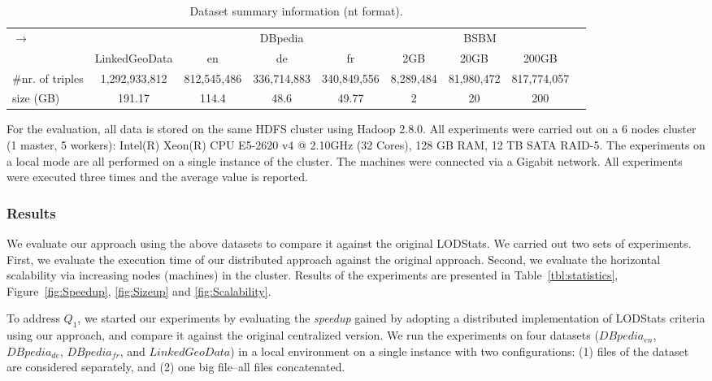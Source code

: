 \begin{table}
\centering
{\caption{Dataset summary information (nt format).}\label{tab:dataset_info}}
\begin{tabularx}{\textwidth}{Xcccccccc}	
\toprule
\multirow{2}{*}{$\longrightarrow$} & \multicolumn{1}{c}{} & \multicolumn{3}{c|}{DBpedia} & \multicolumn{3}{c}{BSBM} \\
\cline{3-9}  \rule{0pt}{10pt}
& LinkedGeoData & \scriptsize{en} & \scriptsize{de} & \scriptsize{fr}  & \scriptsize{2GB} &\scriptsize{20GB} &\scriptsize{200GB}\\
\midrule
\scriptsize{\#nr. of triples}& \scriptsize{1,292,933,812} & \scriptsize{812,545,486} & \scriptsize{336,714,883} & \scriptsize{340,849,556} & \scriptsize{8,289,484} & \scriptsize{81,980,472} & \scriptsize{817,774,057} & \\
\scriptsize{size (GB)} & \scriptsize{191.17} & \scriptsize{114.4} & \scriptsize{48.6} & \scriptsize{49.77} & \scriptsize{2} &\scriptsize{20} &\scriptsize{200} & \\
\bottomrule
\end{tabularx}
\end{table}

For the evaluation, all data is stored on the same HDFS cluster using Hadoop 2.8.0.
All experiments were carried out on a 6 nodes cluster (1 master, 5 workers): Intel(R) Xeon(R) CPU E5-2620 v4 @ 2.10GHz (32 Cores), 128 GB RAM, 12 TB SATA RAID-5.
The experiments on a local mode are all performed on a single instance of the cluster.
The machines were connected via a Gigabit network.
All experiments were executed three times and the average value is reported.

\subsubsection{Results}

We evaluate our approach using the above datasets to compare it against the original LODStats.
We carried out two sets of experiments.
First, we evaluate the execution time of our distributed approach against the original approach.
Second, we evaluate the horizontal scalability via increasing nodes (machines) in the cluster. 
Results of the experiments are presented in Table~\ref{tbl:statistics}, Figure~\ref{fig:Speedup}, \ref{fig:Sizeup} and \ref{fig:Scalability}.

\label{subsubsection:large_scale_datasets}
To address $Q_1$, we started our experiments by evaluating the \textit{speedup} gained by adopting a distributed implementation of LODStats criteria using our approach, and compare it against the original centralized version.
We run the experiments on four datasets
($DBpedia_{en}$, $DBpedia_{de}$, $DBpedia_{fr}$, and $LinkedGeoData$) in a local environment on a single instance with two configurations:  (1) files of the dataset are considered separately, and (2) one big file--all files concatenated.

